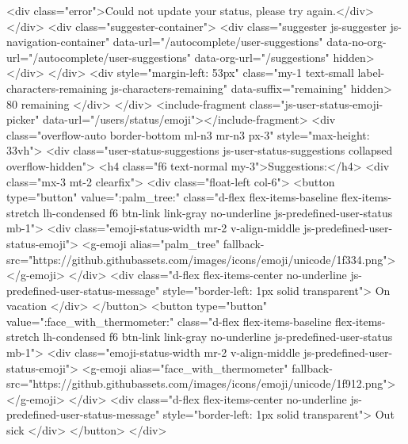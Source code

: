               <div class="error">Could not update your status, please try again.</div>
            </div>
            <div class="suggester-container">
              <div class="suggester js-suggester js-navigation-container" data-url="/autocomplete/user-suggestions" data-no-org-url="/autocomplete/user-suggestions" data-org-url="/suggestions" hidden>
              </div>
            </div>
            <div style="margin-left: 53px" class="my-1 text-small label-characters-remaining js-characters-remaining" data-suffix="remaining" hidden>
              80 remaining
            </div>
          </div>
          <include-fragment class="js-user-status-emoji-picker" data-url="/users/status/emoji"></include-fragment>
          <div class="overflow-auto border-bottom ml-n3 mr-n3 px-3" style="max-height: 33vh">
            <div class="user-status-suggestions js-user-status-suggestions collapsed overflow-hidden">
              <h4 class="f6 text-normal my-3">Suggestions:</h4>
              <div class="mx-3 mt-2 clearfix">
                  <div class="float-left col-6">
                      <button type="button" value=":palm_tree:" class="d-flex flex-items-baseline flex-items-stretch lh-condensed f6 btn-link link-gray no-underline js-predefined-user-status mb-1">
                        <div class="emoji-status-width mr-2 v-align-middle js-predefined-user-status-emoji">
                          <g-emoji alias="palm_tree" fallback-src="https://github.githubassets.com/images/icons/emoji/unicode/1f334.png">🌴</g-emoji>
                        </div>
                        <div class="d-flex flex-items-center no-underline js-predefined-user-status-message" style="border-left: 1px solid transparent">
                          On vacation
                        </div>
                      </button>
                      <button type="button" value=":face_with_thermometer:" class="d-flex flex-items-baseline flex-items-stretch lh-condensed f6 btn-link link-gray no-underline js-predefined-user-status mb-1">
                        <div class="emoji-status-width mr-2 v-align-middle js-predefined-user-status-emoji">
                          <g-emoji alias="face_with_thermometer" fallback-src="https://github.githubassets.com/images/icons/emoji/unicode/1f912.png">🤒</g-emoji>
                        </div>
                        <div class="d-flex flex-items-center no-underline js-predefined-user-status-message" style="border-left: 1px solid transparent">
                          Out sick
                        </div>
                      </button>
                  </div>
